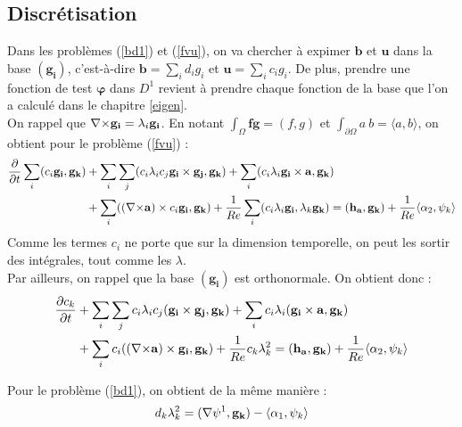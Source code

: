 \subsection{Discrétisation}
\label{discr}

Dans les problèmes (\ref{bd1}) et (\ref{fvu}), on va chercher à expimer $\mathbf{b}$ et $\mathbf{u}$ dans la base $(\mathbf{g_i})$, c'est-à-dire $\mathbf{b}=\sum_i d_ig_i$ et $\mathbf{u}=\sum_i c_ig_i$. De plus, prendre une fonction de test $\bm{\varphi}$ dans $D^1$ revient à prendre chaque fonction de la base que l'on a calculé dans le chapitre \ref{eigen}.\\
On rappel que ${\nabla\times} \mathbf{g_i}=\lambda_i\mathbf{g_i}$. En notant $\int_\Omega \mathbf{f}\mathbf{g}=(f,g)$ et $\int_{\partial\Omega}a\ b=\langle a,b\rangle$, on obtient pour le problème (\ref{fvu}) :
\begin{align*}
\frac{\partial}{\partial t}\sum_i (c_i\mathbf{g_i}, \mathbf{g_k}) &+ \sum_i\sum_j (c_i\lambda_ic_j\mathbf{g_i}\times \mathbf{g_j},\mathbf{g_k}) + \sum_i(c_i\lambda_i\mathbf{g_i}\times \mathbf{a},\mathbf{g_k})\\
&+ \sum_i (({\nabla\times} \mathbf{a})\times c_i\mathbf{g_i},\mathbf{g_k}) + \frac{1}{Re}\sum_i(c_i\lambda_i\mathbf{g_i}, \lambda_k\mathbf{g_k}) = (\mathbf{h_a},\mathbf{g_k}) + \frac{1}{Re}\langle\alpha_2,\psi_k\rangle
\end{align*}
Comme les termes $c_i$ ne porte que sur la dimension temporelle, on peut les
sortir des intégrales, tout comme les $\lambda$.\\

Par ailleurs, on rappel que la base $(\mathbf{g_i})$ est orthonormale. On obtient donc :
\begin{equation}
\label{fvspec}
\begin{aligned}
\frac{\partial c_k}{\partial t} &+ \sum_i\sum_j c_i\lambda_i c_j(\mathbf{g_i}\times \mathbf{g_j}, \mathbf{g_k}) + \sum_i c_i\lambda_i(\mathbf{g_i}\times \mathbf{a},\mathbf{g_k})\\
&+ \sum_i c_i(({\nabla\times} \mathbf{a})\times \mathbf{g_i}, \mathbf{g_k}) + \frac{1}{Re}c_k\lambda_k^2 = (\mathbf{h_a},\mathbf{g_k}) + \frac{1}{Re}\langle\alpha_2,\psi_k\rangle
\end{aligned}
\end{equation}

Pour le problème (\ref{bd1}), on obtient de la même manière :
\begin{equation}
\label{discbd1}
d_k\lambda_k^2 = ({\nabla}\psi^1,\mathbf{g_k}) - \langle\alpha_1,\psi_k\rangle
\end{equation}

